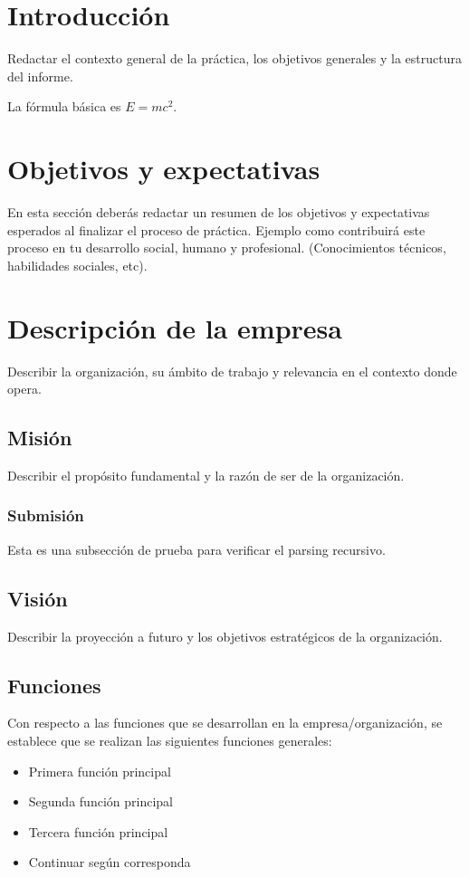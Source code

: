 \documentclass[12pt, a4paper]{article}
\begin{document}
\section{Introducción}
Redactar el contexto general de la práctica, los objetivos generales y la estructura del informe.

La fórmula básica es $E = mc^2$.

\section{Objetivos y expectativas}
En esta sección deberás redactar un resumen de los objetivos y expectativas esperados al finalizar el proceso de práctica. Ejemplo como contribuirá este proceso en tu desarrollo social, humano y profesional. (Conocimientos técnicos, habilidades sociales, etc).

\section{Descripción de la empresa}
Describir la organización, su ámbito de trabajo y relevancia en el contexto donde opera.

\subsection{Misión}
Describir el propósito fundamental y la razón de ser de la organización.

\subsubsection{Submisión}
Esta es una subsección de prueba para verificar el parsing recursivo.

\subsection{Visión}
Describir la proyección a futuro y los objetivos estratégicos de la organización.

\subsection{Funciones}
Con respecto a las funciones que se desarrollan en la empresa/organización, se establece que se realizan las siguientes funciones generales:

\begin{itemize}
    \item Primera función principal
    \item Segunda función principal
    \item Tercera función principal
    \item Continuar según corresponda
\end{itemize}
\end{document}
